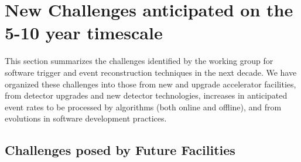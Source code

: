 \section{New Challenges anticipated on the 5-10 year timescale}

This section summarizes the challenges identified by the working group for software trigger and event reconstruction techniques in the next decade. We have organized these 
challenges into those from new and upgrade accelerator facilities, from detector upgrades and new detector technologies, increases in anticipated event rates to be processed 
by algorithms (both online and offline), and from evolutions in software development practices.

\subsection{Challenges posed by Future Facilities }

